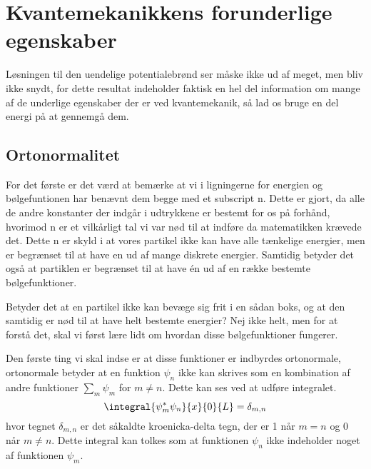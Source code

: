 
\section{Kvantemekanikkens forunderlige egenskaber}
Løsningen til den uendelige potentialebrønd ser måske ikke ud af meget, men bliv ikke snydt, for dette resultat indeholder faktisk en hel del information om mange af de underlige egenskaber der er ved kvantemekanik, så lad os bruge en del energi på at gennemgå dem.
\subsection{Ortonormalitet}
For det første er det værd at bemærke at vi i ligningerne for energien og bølgefuntionen har benævnt dem begge med et subscript n. Dette er gjort, da alle de andre konstanter der indgår i udtrykkene er bestemt for os på forhånd, hvorimod n er et vilkårligt tal vi var nød til at indføre da matematikken krævede det. Dette n er skyld i at vores partikel ikke kan have alle tænkelige energier, men er begrænset til at have en ud af mange diskrete energier. Samtidig betyder det også at partiklen er begrænset til at have én ud af en række bestemte bølgefunktioner.

Betyder det at en partikel ikke kan bevæge sig frit i en sådan boks, og at den samtidig er nød til at have helt bestemte energier? Nej ikke helt, men for at forstå det, skal vi først lære lidt om hvordan disse bølgefunktioner fungerer.

Den første ting vi skal indse er at disse funktioner er indbyrdes ortonormale, ortonormale betyder at en funktion $\psi_n$ ikke kan skrives som en kombination af andre funktioner $\sum_m \psi_m$ for $m\neq n$. Dette kan ses ved at udføre integralet.
\begin{equation*}
    \integral{\psi_m^*\psi_n}{x}{0}{L} = \delta_{m,n}
\end{equation*}
hvor tegnet $\delta_{m,n}$ er det såkaldte kroenicka-delta tegn, der er 1 når $m=n$ og 0 når $m\neq n$. Dette integral kan tolkes som at funktionen $\psi_n$ ikke indeholder noget af funktionen $\psi_m$.

